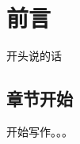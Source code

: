 \documentclass[11pt,oneside]{book}
\begin{document}
\frontmatter

\author{作者}
\titleLC

\chapter*{前言}
\begin{common-format}
开头说的话


\end{common-format}


\setcounter{tocdepth}{2}
\tableofcontents

\begin{common-format}
\mainmatter

\chapter{章节开始}

开始写作。。。





\end{common-format}
\end{document}
